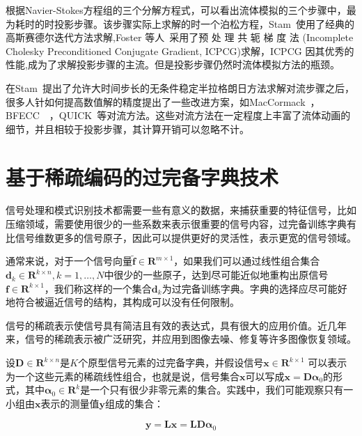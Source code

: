 根据Navier-Stokes方程组的三个分解方程式，可以看出流体模拟的三个步骤中，最为耗时的时投影步骤。该步骤实际上求解的时一个泊松方程，Stam~\cite{stam2003real}使用了经典的 高斯赛德尔迭代方法求解,Foster 等人~\cite{foster2001practical}采用了预 处 理 共 轭 梯 度 法 (Incomplete Cholesky Preconditioned Conjugate Gradient, ICPCG)求解，ICPCG 因其优秀的性能,成为了求解投影步骤的主流。但是投影步骤仍然时流体模拟方法的瓶颈。

在Stam~\cite{stam1999stable}提出了允许大时间步长的无条件稳定半拉格朗日方法求解对流步骤之后，很多人针如何提高数值解的精度提出了一些改进方案，如MacCormack~\cite{selle2008unconditionally}，BFECC~\cite{kim2005flowfixer}~\cite{dupont2003back}，QUICK~\cite{molemaker2008low}等对流方法。这些对流方法在一定程度上丰富了流体动画的细节，并且相较于投影步骤，其计算开销可以忽略不计。

\section{基于稀疏编码的过完备字典技术}

信号处理和模式识别技术都需要一些有意义的数据，来捕获重要的特征信号，比如压缩领域，需要使用很少的一些系数来表示很重要的信号内容，过完备训练字典有比信号维数更多的信号原子，因此可以提供更好的灵活性，表示更宽的信号领域。

通常来说，对于一个信号向量\({ \boldsymbol {\tilde f}} \in {\boldsymbol R}^{m \times 1}\)，如果我们可以通过线性组合集合\(\boldsymbol d_k \in {\boldsymbol R}^{k \times n},k=1,…,N\)中很少的一些原子，达到尽可能近似地重构出原信号\({\boldsymbol f}  \in {\boldsymbol R}^{k \times 1}\)，我们称这样的一个集合\(\boldsymbol d_k\)为过完备训练字典。字典的选择应尽可能好地符合被逼近信号的结构，其构成可以没有任何限制。

信号的稀疏表示使信号具有简洁且有效的表达式，具有很大的应用价值。近几年来，信号的稀疏表示被广泛研究，并应用到图像去噪、修复等许多图像恢复领域。

设${\boldsymbol D} \in {\boldsymbol R}^{k \times n}$是$K$个原型信号元素的过完备字典，并假设信号\({\boldsymbol x}  \in {\boldsymbol R}^{k \times 1}\) 可以表示为一个这些元素的稀疏线性组合，也就是说，信号集合\({\boldsymbol x}\)可以写成${\boldsymbol x} = {\boldsymbol D} \boldsymbol \alpha_0$的形式，其中$\boldsymbol \alpha_0 \in  {\boldsymbol R}^{k}$是一个只有很少非零元素的集合。实践中，我们可能观察只有一小组由${\boldsymbol x}$表示的测量值${\boldsymbol y}$组成的集合：

\begin{equation}
\label{eq:linear}
\boldsymbol y = \boldsymbol L \boldsymbol x =\boldsymbol L \boldsymbol {D\alpha}_0
\end{equation}

